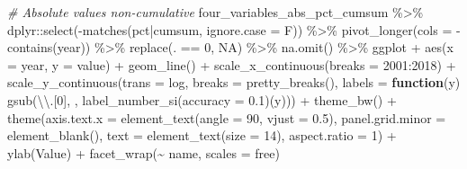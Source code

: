 \documentclass[10pt,landscape,a3paper]{article}
\newenvironment{Shaded}{\begin{snugshade}}{\end{snugshade}}
\newcommand{\AttributeTok}[1]{\textcolor[rgb]{0.77,0.63,0.00}{#1}}
\newcommand{\CommentTok}[1]{\textcolor[rgb]{0.56,0.35,0.01}{\textit{#1}}}
\newcommand{\ConstantTok}[1]{\textcolor[rgb]{0.00,0.00,0.00}{#1}}
\newcommand{\ControlFlowTok}[1]{\textcolor[rgb]{0.13,0.29,0.53}{\textbf{#1}}}
\newcommand{\DecValTok}[1]{\textcolor[rgb]{0.00,0.00,0.81}{#1}}
\newcommand{\FloatTok}[1]{\textcolor[rgb]{0.00,0.00,0.81}{#1}}
\newcommand{\FunctionTok}[1]{\textcolor[rgb]{0.00,0.00,0.00}{#1}}
\newcommand{\NormalTok}[1]{#1}
\newcommand{\SpecialCharTok}[1]{\textcolor[rgb]{0.00,0.00,0.00}{#1}}
\newcommand{\StringTok}[1]{\textcolor[rgb]{0.31,0.60,0.02}{#1}}
\begin{document}
\begin{Shaded}
\begin{Highlighting}[]

\CommentTok{\# Absolute values non{-}cumulative}
\NormalTok{four\_variables\_abs\_pct\_cumsum }\SpecialCharTok{\%\textgreater{}\%}
\NormalTok{  dplyr}\SpecialCharTok{::}\FunctionTok{select}\NormalTok{(}\SpecialCharTok{{-}}\FunctionTok{matches}\NormalTok{(}\StringTok{\textquotesingle{}pct|cumsum\textquotesingle{}}\NormalTok{, }\AttributeTok{ignore.case =}\NormalTok{ F)) }\SpecialCharTok{\%\textgreater{}\%} 
  \FunctionTok{pivot\_longer}\NormalTok{(}\AttributeTok{cols =} \SpecialCharTok{{-}}\FunctionTok{contains}\NormalTok{(}\StringTok{\textquotesingle{}year\textquotesingle{}}\NormalTok{)) }\SpecialCharTok{\%\textgreater{}\%} 
  \FunctionTok{replace}\NormalTok{(. }\SpecialCharTok{==} \DecValTok{0}\NormalTok{, }\ConstantTok{NA}\NormalTok{) }\SpecialCharTok{\%\textgreater{}\%} 
  \FunctionTok{na.omit}\NormalTok{() }\SpecialCharTok{\%\textgreater{}\%} 
\NormalTok{  ggplot }\SpecialCharTok{+} \FunctionTok{aes}\NormalTok{(}\AttributeTok{x =}\NormalTok{ year, }\AttributeTok{y =}\NormalTok{ value) }\SpecialCharTok{+} \FunctionTok{geom\_line}\NormalTok{() }\SpecialCharTok{+}
  \FunctionTok{scale\_x\_continuous}\NormalTok{(}\AttributeTok{breaks =} \DecValTok{2001}\SpecialCharTok{:}\DecValTok{2018}\NormalTok{) }\SpecialCharTok{+} 
  \FunctionTok{scale\_y\_continuous}\NormalTok{(}\AttributeTok{trans =} \StringTok{\textquotesingle{}log\textquotesingle{}}\NormalTok{, }\AttributeTok{breaks =} \FunctionTok{pretty\_breaks}\NormalTok{(),}
                     \AttributeTok{labels =} \ControlFlowTok{function}\NormalTok{(y) }\FunctionTok{gsub}\NormalTok{(}\StringTok{\textquotesingle{}}\SpecialCharTok{\textbackslash{}\textbackslash{}}\StringTok{.[0]\textquotesingle{}}\NormalTok{, }\StringTok{\textquotesingle{}\textquotesingle{}}\NormalTok{, }\FunctionTok{label\_number\_si}\NormalTok{(}\AttributeTok{accuracy =} \FloatTok{0.1}\NormalTok{)(y))) }\SpecialCharTok{+}
  \FunctionTok{theme\_bw}\NormalTok{() }\SpecialCharTok{+}
  \FunctionTok{theme}\NormalTok{(}\AttributeTok{axis.text.x =} \FunctionTok{element\_text}\NormalTok{(}\AttributeTok{angle =} \DecValTok{90}\NormalTok{, }\AttributeTok{vjust =} \FloatTok{0.5}\NormalTok{), }\AttributeTok{panel.grid.minor =} \FunctionTok{element\_blank}\NormalTok{(),}
        \AttributeTok{text =} \FunctionTok{element\_text}\NormalTok{(}\AttributeTok{size =} \DecValTok{14}\NormalTok{), }\AttributeTok{aspect.ratio =} \DecValTok{1}\NormalTok{) }\SpecialCharTok{+}
  \FunctionTok{ylab}\NormalTok{(}\StringTok{\textquotesingle{}Value\textquotesingle{}}\NormalTok{) }\SpecialCharTok{+}
  \FunctionTok{facet\_wrap}\NormalTok{(}\SpecialCharTok{\textasciitilde{}}\NormalTok{ name, }\AttributeTok{scales =} \StringTok{\textquotesingle{}free\textquotesingle{}}\NormalTok{)}
\end{Highlighting}
\end{Shaded}
\end{document}
